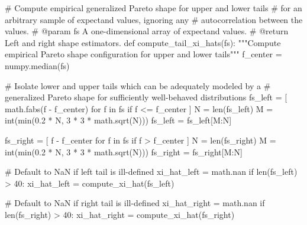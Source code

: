 \documentclass[
  letterpaper,
  DIV=11,
  numbers=noendperiod]{scrartcl}
\newenvironment{Shaded}{\begin{snugshade}}{\end{snugshade}}
\newcommand{\BuiltInTok}[1]{\textcolor[rgb]{0.00,0.23,0.31}{#1}}
\newcommand{\CommentTok}[1]{\textcolor[rgb]{0.37,0.37,0.37}{#1}}
\newcommand{\ControlFlowTok}[1]{\textcolor[rgb]{0.00,0.23,0.31}{#1}}
\newcommand{\DecValTok}[1]{\textcolor[rgb]{0.68,0.00,0.00}{#1}}
\newcommand{\FloatTok}[1]{\textcolor[rgb]{0.68,0.00,0.00}{#1}}
\newcommand{\KeywordTok}[1]{\textcolor[rgb]{0.00,0.23,0.31}{#1}}
\newcommand{\NormalTok}[1]{\textcolor[rgb]{0.00,0.23,0.31}{#1}}
\newcommand{\OperatorTok}[1]{\textcolor[rgb]{0.37,0.37,0.37}{#1}}
\begin{document}
\begin{Shaded}
\begin{Highlighting}[]

\CommentTok{\# Compute empirical generalized Pareto shape for upper and lower tails}
\CommentTok{\# for an arbitrary sample of expectand values, ignoring any }
\CommentTok{\# autocorrelation between the values.}
\CommentTok{\# @param fs A one{-}dimensional array of expectand values.}
\CommentTok{\# @return Left and right shape estimators.}
\KeywordTok{def}\NormalTok{ compute\_tail\_xi\_hats(fs):}
  \CommentTok{"""Compute empirical Pareto shape configuration for upper and lower tails"""}
\NormalTok{  f\_center }\OperatorTok{=}\NormalTok{ numpy.median(fs)}
  
  \CommentTok{\# Isolate lower and upper tails which can be adequately modeled by a }
  \CommentTok{\# generalized Pareto shape for sufficiently well{-}behaved distributions}
\NormalTok{  fs\_left }\OperatorTok{=}\NormalTok{ [ math.fabs(f }\OperatorTok{{-}}\NormalTok{ f\_center) }\ControlFlowTok{for}\NormalTok{ f }\KeywordTok{in}\NormalTok{ fs }\ControlFlowTok{if}\NormalTok{ f }\OperatorTok{\textless{}=}\NormalTok{ f\_center ]}
\NormalTok{  N }\OperatorTok{=} \BuiltInTok{len}\NormalTok{(fs\_left)}
\NormalTok{  M }\OperatorTok{=} \BuiltInTok{int}\NormalTok{(}\BuiltInTok{min}\NormalTok{(}\FloatTok{0.2} \OperatorTok{*}\NormalTok{ N, }\DecValTok{3} \OperatorTok{*} \DecValTok{3} \OperatorTok{*}\NormalTok{ math.sqrt(N)))}
\NormalTok{  fs\_left }\OperatorTok{=}\NormalTok{ fs\_left[M:N]}
  
\NormalTok{  fs\_right }\OperatorTok{=}\NormalTok{ [ f }\OperatorTok{{-}}\NormalTok{ f\_center }\ControlFlowTok{for}\NormalTok{ f }\KeywordTok{in}\NormalTok{ fs }\ControlFlowTok{if}\NormalTok{ f }\OperatorTok{\textgreater{}}\NormalTok{ f\_center ]}
\NormalTok{  N }\OperatorTok{=} \BuiltInTok{len}\NormalTok{(fs\_right)}
\NormalTok{  M }\OperatorTok{=} \BuiltInTok{int}\NormalTok{(}\BuiltInTok{min}\NormalTok{(}\FloatTok{0.2} \OperatorTok{*}\NormalTok{ N, }\DecValTok{3} \OperatorTok{*} \DecValTok{3} \OperatorTok{*}\NormalTok{ math.sqrt(N)))}
\NormalTok{  fs\_right }\OperatorTok{=}\NormalTok{ fs\_right[M:N] }
  
  \CommentTok{\# Default to NaN if left tail is ill{-}defined}
\NormalTok{  xi\_hat\_left }\OperatorTok{=}\NormalTok{ math.nan}
  \ControlFlowTok{if} \BuiltInTok{len}\NormalTok{(fs\_left) }\OperatorTok{\textgreater{}} \DecValTok{40}\NormalTok{:}
\NormalTok{    xi\_hat\_left }\OperatorTok{=}\NormalTok{ compute\_xi\_hat(fs\_left)}
  
  \CommentTok{\# Default to NaN if right tail is ill{-}defined}
\NormalTok{  xi\_hat\_right }\OperatorTok{=}\NormalTok{ math.nan}
  \ControlFlowTok{if} \BuiltInTok{len}\NormalTok{(fs\_right) }\OperatorTok{\textgreater{}} \DecValTok{40}\NormalTok{:}
\NormalTok{    xi\_hat\_right }\OperatorTok{=}\NormalTok{ compute\_xi\_hat(fs\_right)}
    
\end{Highlighting}
\end{Shaded}
\end{document}

